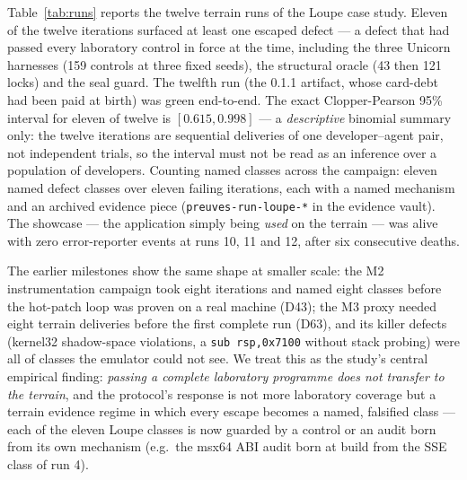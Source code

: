 \documentclass[11pt,a4paper]{article}
\newcommand{\code}[1]{\texttt{\small #1}}
\begin{document}
Table~\ref{tab:runs} reports the twelve terrain runs of the Loupe case
study. Eleven of the twelve iterations surfaced at least one escaped
defect --- a defect that had passed every laboratory control in force at
the time, including the three Unicorn harnesses (159 controls at three
fixed seeds), the structural oracle (43 then 121 locks) and the seal
guard. The twelfth run (the 0.1.1 artifact, whose card-debt had been paid
at birth) was green end-to-end. The exact Clopper-Pearson 95\% interval
for eleven of twelve is $[0.615, 0.998]$ --- a \emph{descriptive}
binomial summary only: the twelve iterations are sequential deliveries
of one developer--agent pair, not independent trials, so the interval
must not be read as an inference over a population of developers.
Counting named classes across the
campaign: eleven named defect classes over eleven failing iterations,
each with a named mechanism and an archived evidence piece
(\code{preuves-run-loupe-*} in the evidence vault). The showcase ---
the application simply being \emph{used} on the terrain --- was alive with
zero error-reporter events at runs 10, 11 and 12, after six consecutive
deaths.

The earlier milestones show the same shape at smaller scale: the M2
instrumentation campaign took eight iterations and named eight classes
before the hot-patch loop was proven on a real machine (D43); the M3
proxy needed eight terrain deliveries before the first complete run
(D63), and its killer defects (kernel32 shadow-space violations, a
\code{sub rsp,0x7100} without stack probing) were all of classes the
emulator could not see. We treat this as the study's central empirical
finding: \emph{passing a complete laboratory programme does not transfer
to the terrain}, and the protocol's response is not more laboratory
coverage but a terrain evidence regime in which every escape becomes a
named, falsified class --- each of the eleven Loupe classes is now
guarded by a control or an audit born from its own mechanism (e.g.\ the
msx64 ABI audit born at build from the SSE class of run 4).
\end{document}
